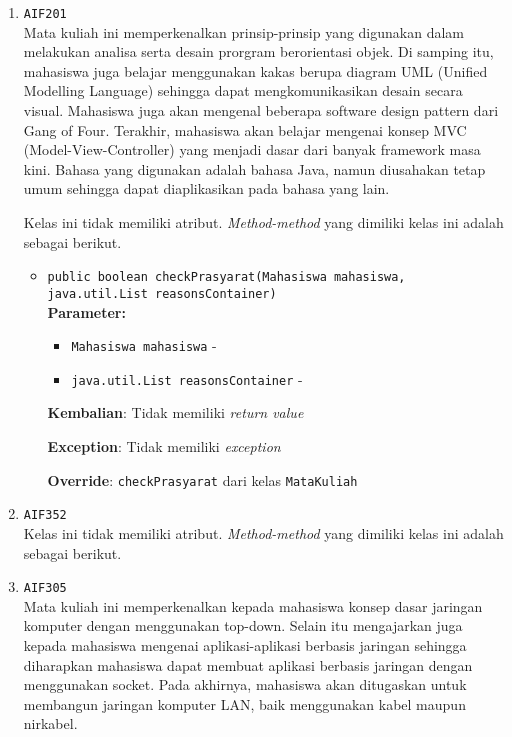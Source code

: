 \documentclass{article}
\begin{document}
\begin{enumerate}
\begin{itemize}
\end{itemize}
\item \texttt{AIF201}\\ 
Mata kuliah ini memperkenalkan prinsip-prinsip yang digunakan dalam 
 melakukan analisa serta desain prorgram berorientasi objek. Di samping itu, 
 mahasiswa juga belajar menggunakan kakas berupa diagram UML (Unified 
 Modelling Language) sehingga dapat mengkomunikasikan desain secara visual. 
 Mahasiswa juga akan mengenal beberapa software design pattern dari Gang of 
 Four. Terakhir, mahasiswa akan belajar mengenai konsep MVC 
 (Model-View-Controller) yang menjadi dasar dari banyak framework masa kini.
 Bahasa yang digunakan adalah bahasa Java, namun diusahakan tetap umum 
 sehingga dapat diaplikasikan pada bahasa yang lain.

Kelas ini tidak memiliki atribut. \textit{Method-method} yang dimiliki kelas ini adalah sebagai berikut.
\begin{itemize}
\item \texttt{public boolean checkPrasyarat(Mahasiswa mahasiswa, java.util.List reasonsContainer)}\\ 


\textbf{Parameter:}\begin{itemize}
\item \texttt{Mahasiswa mahasiswa} - 
\item \texttt{java.util.List reasonsContainer} - 
\end{itemize}
\textbf{Kembalian}: Tidak memiliki \textit{return value}

\textbf{Exception}: Tidak memiliki \textit{exception}

\textbf{Override}: \texttt{checkPrasyarat} dari kelas \texttt{MataKuliah}

\end{itemize}
\item \texttt{AIF352}\\ 
Kelas ini tidak memiliki atribut. \textit{Method-method} yang dimiliki kelas ini adalah sebagai berikut.
\begin{itemize}
\end{itemize}
\item \texttt{AIF305}\\ 
Mata kuliah ini memperkenalkan kepada mahasiswa konsep dasar jaringan
 komputer dengan menggunakan top-down. Selain itu mengajarkan juga kepada
 mahasiswa mengenai aplikasi-aplikasi berbasis jaringan sehingga diharapkan
 mahasiswa dapat membuat aplikasi berbasis jaringan dengan menggunakan socket.
 Pada akhirnya, mahasiswa akan ditugaskan untuk membangun jaringan komputer
 LAN, baik menggunakan kabel maupun nirkabel.


\end{enumerate}
\end{document}
